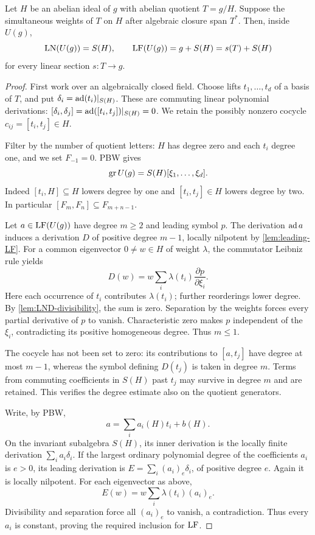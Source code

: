 \begin{proposition}\label{prop:LF-LN}
Let $H$ be an abelian ideal of $g$ with abelian quotient
$T=g/H$. Suppose the simultaneous weights of $T$ on $H$
after algebraic closure span $T^*$. Then, inside $U(g)$,
\[
 \operatorname{LN}(U(g))=S(H),\qquad
 \operatorname{LF}(U(g))=g+S(H)=s(T)+S(H)
\]
for every linear section $s:T\to g$.
\end{proposition}
\begin{proof}
First work over an algebraically closed field. Choose lifts
$t_1,\ldots,t_d$ of a basis of $T$, and put
$\delta_i=\operatorname{ad}(t_i)|_{S(H)}$. These are commuting linear polynomial
derivations: $[\delta_i,\delta_j]=\operatorname{ad}([t_i,t_j])|_{S(H)}=0$.
We retain the possibly nonzero cocycle $c_{ij}=[t_i,t_j]\in H$.

Filter by the number of quotient letters: $H$ has degree zero and
each $t_i$ degree one, and we set $F_{-1}=0$. PBW gives
\[
 \operatorname{gr} U(g)=S(H)[\xi_1,\ldots,\xi_d].
\]
Indeed $[t_i,H]\subseteq H$ lowers degree by one and $[t_i,t_j]\in H$
lowers degree by two. In particular $[F_m,F_n]\subseteq F_{m+n-1}$.

Let $a\in\operatorname{LF}(U(g))$ have degree $m\ge2$ and leading
symbol $p$. The derivation $\operatorname{ad} a$ induces a derivation $D$ of
positive degree $m-1$, locally nilpotent by \cref{lem:leading-LF}.
For a common eigenvector $0\ne w\in H$ of weight $\lambda$, the
commutator Leibniz rule yields
\[
 D(w)=w\sum_i\lambda(t_i)\frac{\partial p}{\partial\xi_i}.
\]
Here each occurrence of $t_i$ contributes $\lambda(t_i)$; further
reorderings lower degree. By \cref{lem:LND-divisibility}, the sum is
zero. Separation by the weights forces every partial derivative of
$p$ to vanish. Characteristic zero makes $p$ independent of the
$\xi_i$, contradicting its positive homogeneous degree. Thus $m\le1$.

The cocycle has not been set to zero: its contributions to $[a,t_j]$
have degree at most $m-1$, whereas the symbol defining $D(t_j)$ is
taken in degree $m$. Terms from commuting coefficients in $S(H)$
past $t_j$ may survive in degree $m$ and are retained. This verifies
the degree estimate also on the quotient generators.

Write, by PBW,
\[
 a=\sum_i a_i(H)t_i+b(H).
\]
On the invariant subalgebra $S(H)$, its inner derivation is the
locally finite derivation $\sum_i a_i\delta_i$. If the largest
ordinary polynomial degree of the coefficients $a_i$ is $e>0$, its
leading derivation is $E=\sum_i(a_i)_e\delta_i$, of positive degree
$e$. Again it is locally nilpotent. For each eigenvector as above,
\[
 E(w)=w\sum_i\lambda(t_i)(a_i)_e.
\]
Divisibility and separation force all $(a_i)_e$ to vanish, a
contradiction. Thus every $a_i$ is constant, proving the required
inclusion for $\operatorname{LF}$.


\end{proof}
